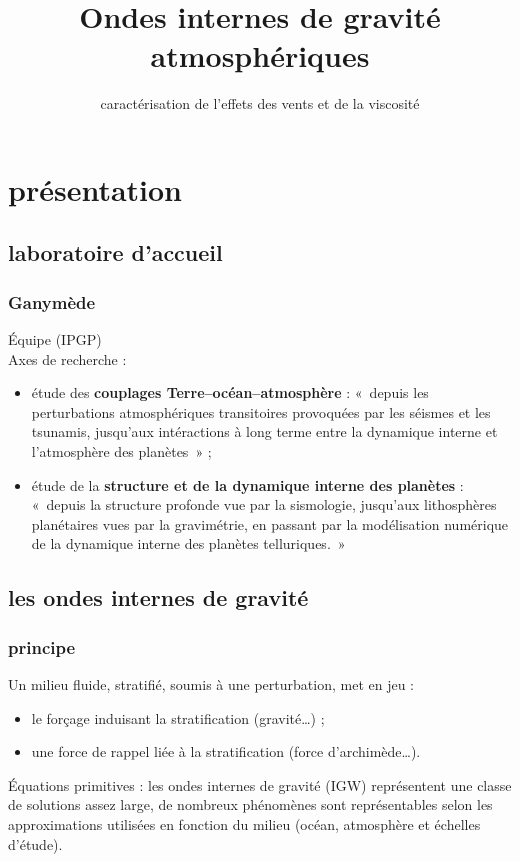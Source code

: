 \documentclass[c]{beamer}
\title[IGW, vents \& viscosité]{Ondes internes de gravité atmosphériques}
\subtitle{caractérisation de l'effets des vents et de la viscosité}
\institute[UPMC]{Université Pierre et Marie Curie\\ \vspace{2em}\texttt{[image: upmc]}}
\begin{document}
\frame[plain]{\titlepage}
\frame[plain]{\tableofcontents}

\section{présentation}

\subsection{laboratoire d'accueil}

\begin{frame}
\frametitle{Ganymède}
Équipe  (IPGP)\\
Axes de recherche :
\begin{itemize}
    \item étude des \textbf{couplages Terre--océan--atmosphère} : « depuis les perturbations atmosphériques transitoires provoquées par les séismes et les tsunamis, jusqu'aux intéractions à long terme entre la dynamique interne et l'atmosphère des planètes » ;
    \item étude de la \textbf{structure et de la dynamique interne des planètes} : « depuis la structure profonde vue par la sismologie, jusqu'aux lithosphères planétaires vues par la gravimétrie, en passant par la modélisation numérique de la dynamique interne des planètes telluriques. »
\end{itemize}
\end{frame}

\subsection{les ondes internes de gravité}

\begin{frame}
\frametitle{principe}
Un milieu fluide, stratifié, soumis à une perturbation, met en jeu :
\begin{itemize}
    \item le forçage induisant la stratification (gravité…) ;
    \item une force de rappel liée à la stratification (force d'archimède…).\plop
\end{itemize}
Équations primitives : les ondes internes de gravité (IGW) représentent une classe de solutions assez large, de nombreux phénomènes sont représentables selon les approximations utilisées en fonction du milieu (océan, atmosphère et échelles d'étude).
\end{frame}
\end{document}
